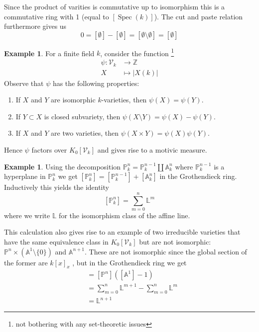 \documentclass[11pt, a4paper, german]{article}
\theoremstyle{plain}
\theoremstyle{definition}
\newtheorem{example}[theorem]{Example}
\newcommand{\gring}[1][k]{K_0[\mathcal{V}_#1]}
\DeclareMathOperator{\Spec}{Spec}
\begin{document}
Since the product of varities is commutative up to isomorphism this is a commutative ring with 1 (equal to $[\Spec(k)]$). 
The cut and paste relation furthermore gives us
\[
    0 = [\emptyset] - [\emptyset] = [\emptyset \setminus \emptyset] = [\emptyset]
\]

\begin{example}
    For a finite field $k$, consider the function \footnote{not bothering with any set-theoretic issues} 
    \begin{align*}
        \psi \colon \mathcal{V}_k & \to   \mathbb{Z}\\
        X & \mapsto |X(k)|
    \end{align*}
    Observe that $\psi$ has the following properties:
    \begin{enumerate}
        \item If $X$ and $Y$ are isomorphic $k$-varieties, then $\psi(X) = \psi(Y)$.
        \item If $Y \subset X$ is closed subvariety, then $\psi(X \setminus Y) = \psi(X) - \psi(Y)$.
        \item If $X$ and $Y$ are two varieties, then $\psi(X \times Y) = \psi(X)\psi(Y)$.
    \end{enumerate}
    Hence $\psi$ factors over $\gring[k]$ and gives rise to a motivic measure.
\end{example}

\begin{example}
    \label{projSum}
    Using the decomposition $\mathbb{P}_k^n = \mathbb{P}_k^{n-1} \coprod \mathbb{A}_k^n$ where $\mathbb{P}_k^{n-1}$ is a hyperplane
    in $\mathbb{P}_k^n$  we get $[\mathbb{P}_k^n] = [\mathbb{P}_k^{n-1}] + [\mathbb{A}_k^n]$ in the Grothendieck ring.
    Inductively this yields the identity 
    \[
        [\mathbb{P}_k^n] = \sum_{m=0}^n \mathbb{L}^m
    \]
    where we write $\mathbb{L}$ for the isomorphism class of the affine line.
\end{example}

This calculation also gives rise to an example of two irreducible varieties that have the same equivalence class in $\gring[k]$ but are not
isomorphic: $\mathbb{P}^n \times (\mathbb{A}^1\setminus \{0\})$ and $\mathbb{A}^{n+1}$. These are not isomorphic since the global section of the
former are $k[x]_{x}$ , but in the Grothendieck ring we get
\begin{align*}
    [\mathbb{P}^n \times \left (\mathbb{A}^1 \setminus \{0\}\right )] &= [\mathbb{P}^n]\left ([\mathbb{A}^1] - 1\right ) \\
                                                                      &= \sum_{m=0}^n \mathbb{L}^{m+1} - \sum_{m=0}^n \mathbb{L}^m \\
                                                                      &= \mathbb{L}^{n+1}
\end{align*}
\end{document}
